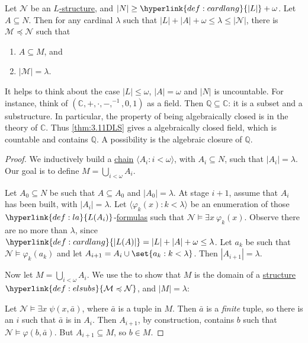 \documentclass{article}
\let\models\vDash
\begin{document}
\begin{nthm}\label{thm:3.11DLS}
  Let $\mathcal{N}$ be an \hyperlink{def:str}{$L$-structure}, and $|N| \geq \hyperlink{def:cardlang}{|L|} + \omega$.
  Let $A \subseteq N$.
  Then for any cardinal $\lambda$ such that $|L| + |A| + \omega \leq \lambda \leq |\mathcal{N}|$, there is \hyperlink{def:elsubs}{$\mathcal{M} \preccurlyeq \mathcal{N}$} such that
  \begin{enumerate}[label=(\roman*)]
    \item $A \subseteq M$, and
    \item $|\mathcal{M}| = \lambda$.
  \end{enumerate}
\end{nthm}
It helps to think about the case $|L| \leq \omega$, $|A| = \omega$ and $|N|$ is uncountable.
For instance, think of $(\mathbb{C}, + , \cdot, -, ^{-1}, 0,1)$ as a field.
Then $\mathbb{Q} \subseteq \mathbb{C}$: it is a subset and a substructure.
In particular, the property of being algebraically closed is in the theory of $\mathbb{C}$.
Thus \cref{thm:3.11DLS} gives a algebraically closed field, which is countable and contains $\mathbb{Q}$. A possibility is the algebraic closure of $\mathbb{Q}$.

\begin{proof}
  We inductively build a \hyperlink{def:chain}{chain} $\langle A_i  : i < \omega \rangle$, with $A_i \subseteq N$, such that $|A_i| = \lambda$.
  Our goal is to define $M = \bigcup_{i < \omega} A_i$.

  Let $A_0 \subseteq N$ be such that $A \subseteq A_0$ and $|A_0| = \lambda$.
  At stage $i+1$, assume that $A_i$ has been built, with $|A_i| = \lambda$.
  Let $\langle \varphi_k(x) : k < \lambda  \rangle$ be an enumeration of those $\hyperlink{def:la}{L(A_i)}$-\hyperlink{def:form}{formulas} such that $\mathcal{N} \models \exists x \ \varphi_k(x)$. Observe there are no more than $\lambda$, since $\hyperlink{def:cardlang}{|L(A)|} = |L| + |A| + \omega \leq \lambda$.
  Let $a_k$ be such that $\mathcal{N} \models \varphi_k(a_k)$ and let $A_{i+1} = A_i \cup \set{a_k : k < \lambda}$.
  Then $|A_{i+1}| = \lambda$.

  Now let $M = \bigcup_{i < \omega} A_i$.
  We use the  to show that $M$ is the domain of a \hyperlink{def:str}{structure} $\hyperlink{def:elsubs}{\mathcal{M} \preccurlyeq \mathcal{N}}$, and $|M| = \lambda$:

  Let $\mathcal{N} \models \exists x \; \psi(x,\bar{a})$, where $\bar{a}$ is a tuple in $M$.
  Then $\bar{a}$ is a \emph{finite} tuple, so there is an $i$ such that $\bar{a}$ is in $A_i$.
  Then $A_{i+1}$, by construction, contains $b$ such that $\mathcal{N} \models \varphi(b, \bar{a})$.
  But $A_{i+1} \subseteq M$, so $b \in M$.
\end{proof}
\end{document}
